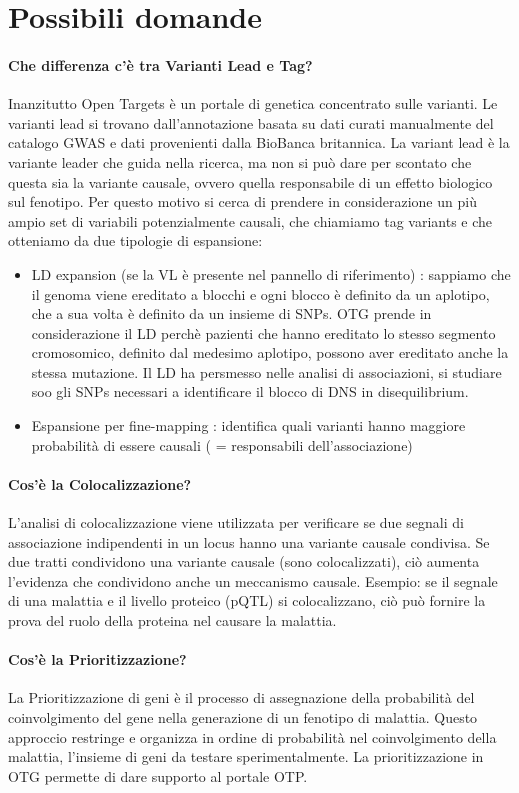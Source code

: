 \documentclass{article}
\begin{document}
\section{Possibili domande}
\paragraph{Che differenza c'è tra Varianti Lead e Tag?}
Inanzitutto Open Targets è un portale di genetica concentrato sulle varianti. Le varianti lead si trovano dall'annotazione basata su dati curati manualmente del catalogo GWAS e dati provenienti dalla BioBanca britannica. 
La variant lead è la variante leader che guida nella ricerca, ma non si può dare per scontato che questa sia la variante causale, ovvero quella responsabile di un effetto biologico sul fenotipo. Per questo motivo si cerca di prendere in considerazione un più ampio set di variabili potenzialmente causali, che chiamiamo tag variants e che otteniamo da due tipologie di espansione: 
\begin{itemize}
    \item LD expansion (se la VL è presente nel pannello di riferimento) : sappiamo che il genoma viene ereditato a blocchi e ogni blocco è definito da un aplotipo, che a sua volta è definito da un insieme di SNPs. OTG prende in considerazione il LD perchè pazienti che hanno ereditato lo stesso segmento cromosomico, definito dal medesimo aplotipo, possono aver ereditato anche la stessa mutazione. Il LD ha persmesso nelle analisi di associazioni, si studiare soo gli SNPs necessari a identificare il blocco di DNS in disequilibrium. 
    \item  Espansione per fine-mapping : identifica quali varianti hanno maggiore probabilità di essere causali ( = responsabili dell’associazione)
\end{itemize}
\paragraph{Cos'è la Colocalizzazione?}
L'analisi di colocalizzazione viene utilizzata per verificare se due segnali di associazione indipendenti in un locus hanno una variante causale condivisa. Se due tratti condividono una variante causale (sono colocalizzati), ciò aumenta l'evidenza che condividono anche un meccanismo causale. 
 Esempio: se il segnale di una malattia e il livello proteico (pQTL) si colocalizzano, ciò può fornire la prova del ruolo della proteina nel causare la malattia.
\paragraph{Cos'è la Prioritizzazione?}
La Prioritizzazione di geni è il processo di assegnazione della probabilità del coinvolgimento del gene nella generazione di un fenotipo di malattia. Questo approccio restringe e organizza in ordine di probabilità nel coinvolgimento della malattia, l'insieme di geni da testare sperimentalmente. 
La prioritizzazione in OTG permette di dare supporto al portale OTP. 
\end{document}
